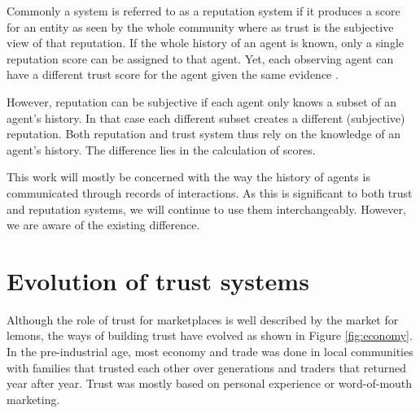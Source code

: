 Commonly a system is referred to as a reputation system if it produces a score for an entity as 
seen by the whole community where as trust is the subjective view of that reputation. If the whole 
history of an agent is known, only a single reputation score can be assigned to that agent. Yet, 
each observing agent can have a different trust score for the agent given the same evidence \cite{josang2007survey}.

However, reputation can be subjective if each agent only knows a subset of an agent's history. In that
case each different subset creates a different (subjective) reputation. Both reputation and trust 
system thus rely on the knowledge of an agent's history. The difference lies in the calculation of 
scores. 

This work will mostly be concerned with the way the history of agents is communicated through records
of interactions. As this is significant to both trust and reputation systems, we will continue to use them 
interchangeably. However, we are aware of the existing difference.

\section{Evolution of trust systems}
Although the role of trust for marketplaces is well described by the market for lemons, the ways of 
building trust have evolved as shown in Figure \ref{fig:economy}. In the pre-industrial age, most economy and trade was done in local
communities with families that trusted each other over generations and traders that returned year
after year. Trust was mostly based on personal experience or word-of-mouth marketing. 

